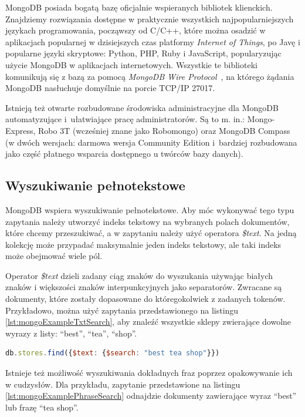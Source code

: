 MongoDB posiada bogatą bazę oficjalnie wspieranych bibliotek klienckich.
Znajdziemy rozwiązania dostępne w praktycznie wszystkich najpopularniejszych językach programowania, począwszy od C/C++, które można osadzić w aplikacjach popularnej w dzisiejszych czas platformy \textit{Internet of Things}, po Javę i popularne języki skryptowe: Python, PHP, Ruby i JavaScript, popularyzując użycie MongoDB w aplikacjach internetowych.
Wszystkie te biblioteki komunikują się z bazą za pomocą \textit{MongoDB Wire Protocol}~\cite{MongoDBWireProtocol}, na którego żądania MongoDB nasłuchuje domyślnie na porcie TCP/IP 27017.

Istnieją też otwarte rozbudowane środowiska administracyjne dla MongoDB automatyzujące i~ułatwiające pracę administratorów.
Są to m. in.: Mongo-Express, Robo 3T (wcześniej znane jako Robomongo) oraz MongoDB Compass (w dwóch wersjach: darmowa wersja Community Edition i~bardziej rozbudowana jako część płatnego wsparcia dostępnego u twórców bazy danych).

\subsection{Wyszukiwanie pełnotekstowe}

MongoDB wspiera wyszukiwanie pełnotekstowe.
Aby móc wykonywać tego typu zapytania należy utworzyć indeks tekstowy na wybranych polach dokumentów, które chcemy przeszukiwać, a w zapytaniu należy użyć operatora \textit{\$text}.
Na jedną kolekcję może przypadać maksymalnie jeden indeks tekstowy, ale taki indeks może obejmować wiele pól.

Operator \textit{\$text} dzieli zadany ciąg znaków do wyszukania używając białych znaków i większości znaków interpunkcyjnych jako separatorów.
Zwracane są dokumenty, które zostały dopasowane do któregokolwiek z zadanych tokenów.
Przykładowo, można użyć zapytania przedstawionego na listingu \ref{lst:mongoExampleTxtSearch}, aby znaleźć wszystkie sklepy zwierające dowolne wyrazy z listy: \enquote{best}, \enquote{tea}, \enquote{shop}.

\begin{minipage}{\linewidth}
\begin{lstlisting}[language=JavaScript,caption={Zapytanie wykonujące wyszukiwanie pełnotekstowe},label={lst:mongoExampleTxtSearch}]
db.stores.find({$text: {$search: "best tea shop"}})
\end{lstlisting}
\end{minipage}

Istnieje też możliwość wyszukiwania dokładnych fraz poprzez opakowywanie ich w cudzysłów. 
Dla przykładu, zapytanie przedstawione na listingu \ref{lst:mongoExamplePhraseSearch}
odnajdzie dokumenty zawierające wyraz \enquote{best} lub frazę \enquote{tea shop}.

